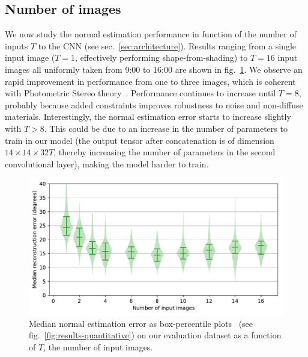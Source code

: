 \subsection{Number of images}
\label{sec:ablation_study}

We now study the normal estimation performance in function of the number of inputs $T$ to the CNN (see sec.~\ref{sec:architecture}). Results ranging from a single input image ($T=1$, effectively performing shape-from-shading) to $T=16$ input images all uniformly taken from 9:00 to 16:00 are shown in fig.~\ref{fig:number_of_inputs}. We observe an rapid improvement in performance from one to three images, which is coherent with Photometric Stereo theory~\cite{woodham-opteng-80}. Performance continues to increase until $T=8$, probably because added constraints improves robustness to noise and non-diffuse materials. Interestingly, the normal estimation error starts to increase slightly with $T > 8$. This could be due to an increase in the number of parameters to train in our model (the output tensor after concatenation is of dimension $14 \times 14 \times 32T$, thereby increasing the number of parameters in the second convolutional layer), making the model harder to train.



\begin{figure}[!t]
\centering
\includegraphics[width=0.75\linewidth]{figures/analysis/input_ablation.pdf}
\caption[Ablation study: surface reconstruction performance in function of the number of input images]{Median normal estimation error as box-percentile plots~\cite{esty-jss-03} (see fig.~\ref{fig:results-quantitative}) on our evaluation dataset as a function of $T$, the number of input images.}
\label{fig:number_of_inputs}
\end{figure}


